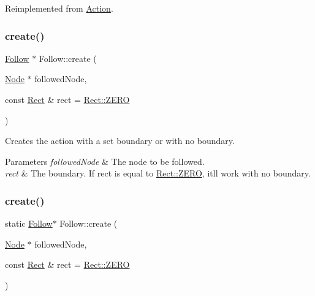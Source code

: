 Reimplemented from \hyperlink{classAction_a6a047ad6b3bd200b0f86c7bb519b31ea}{Action}.

\mbox{\label{classFollow_aeb7d82d7545e2b2ab7826f8f6661d5b7}} 
\subsubsection{\texorpdfstring{create()}{create()}\hspace{0.1cm}{\footnotesize\ttfamily [1/2]}}
{\footnotesize\ttfamily \hyperlink{classFollow}{Follow} $\ast$ Follow\+::create (\begin{DoxyParamCaption}\item[{\hyperlink{classNode}{Node} $\ast$}]{followed\+Node,  }\item[{const \hyperlink{classRect}{Rect} \&}]{rect = {\ttfamily \hyperlink{classRect_a590be46e60027b2ca0f62a457f91a83e}{Rect\+::\+Z\+E\+RO}} }\end{DoxyParamCaption})\hspace{0.3cm}{\ttfamily [static]}}

Creates the action with a set boundary or with no boundary.


\begin{DoxyParams}{Parameters}
{\em followed\+Node} & The node to be followed. \\
\hline
{\em rect} & The boundary. If {\ttfamily rect} is equal to \hyperlink{classRect_a590be46e60027b2ca0f62a457f91a83e}{Rect\+::\+Z\+E\+RO}, it\textquotesingle{}ll work with no boundary. \\
\hline
\end{DoxyParams}
\mbox{\label{classFollow_a219ed46966d5f7065cf628df6eed4681}} 
\subsubsection{\texorpdfstring{create()}{create()}\hspace{0.1cm}{\footnotesize\ttfamily [2/2]}}
{\footnotesize\ttfamily static \hyperlink{classFollow}{Follow}$\ast$ Follow\+::create (\begin{DoxyParamCaption}\item[{\hyperlink{classNode}{Node} $\ast$}]{followed\+Node,  }\item[{const \hyperlink{classRect}{Rect} \&}]{rect = {\ttfamily \hyperlink{classRect_a590be46e60027b2ca0f62a457f91a83e}{Rect\+::\+Z\+E\+RO}} }\end{DoxyParamCaption})\hspace{0.3cm}{\ttfamily [static]}}

